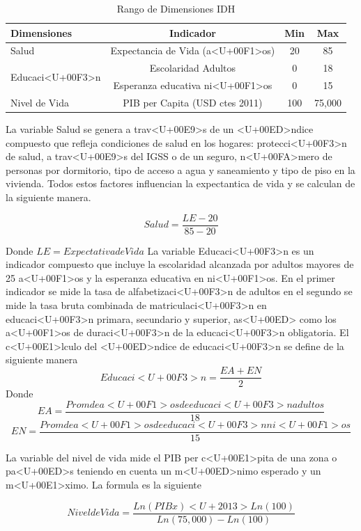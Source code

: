 \documentclass{article}
\begin{document}

\begin{table}[h!]
\centering
  \begin{tabular}{l c c c}
  \hline
  Dimensiones & Indicador & Min & Max \\ [0.25ex]
  \hline \hline
  Salud & Expectancia de Vida (a<U+00F1>os) & 20 & 85 \\
  \multirow{2}{*}{Educaci<U+00F3>n} & Escolaridad Adultos & 0 & 18 \\ 
   & Esperanza educativa ni<U+00F1>os & 0 & 15 \\
  Nivel de Vida  & PIB per Capita (USD ctes 2011) & 100 & 75,000 \\
  \hline
  \end{tabular}
 \caption {Rango de Dimensiones IDH}
  \label{Tabla 1:}
\end {table}  

La variable Salud se genera a trav<U+00E9>s de un <U+00ED>ndice compuesto que refleja condiciones de salud en los hogares: protecci<U+00F3>n de salud, a trav<U+00E9>s del IGSS o de un seguro, n<U+00FA>mero de personas por dormitorio, tipo de acceso a agua y saneamiento y tipo de piso en la vivienda. Todos estos factores influencian la expectantica de vida y se calculan de la siguiente manera.

\[ Salud=\frac{LE-20} {85-20} \]

Donde $LE = Expectativa de Vida$
La variable Educaci<U+00F3>n es un indicador compuesto que incluye la escolaridad alcanzada por adultos mayores de 25 a<U+00F1>os y la esperanza educativa en ni<U+00F1>os. En el primer indicador se mide la tasa de alfabetizaci<U+00F3>n de adultos en el segundo se mide la tasa bruta combinada de matriculaci<U+00F3>n en educaci<U+00F3>n primara, secundario y superior, as<U+00ED> como los a<U+00F1>os de duraci<U+00F3>n de la educaci<U+00F3>n obligatoria. El c<U+00E1>lculo del <U+00ED>ndice de educaci<U+00F3>n se define de la siguiente manera
\[Educaci<U+00F3>n= \frac{EA + EN} {2} \]
Donde
\[EA= \frac{Prom de a<U+00F1>os de educaci<U+00F3>n adultos} {18}  \]
\[EN= \frac{Prom de a<U+00F1>os de educaci<U+00F3>n ni<U+00F1>os} {15}  \]

La variable del nivel de vida mide el PIB per c<U+00E1>pita de una zona o pa<U+00ED>s teniendo en cuenta un m<U+00ED>nimo esperado y un m<U+00E1>ximo. La formula es la siguiente

\[Nivel de Vida = \frac {Ln(PIBx)<U+2013>Ln(100)} {Ln(75,000)-Ln(100)} \]
\end{document}
